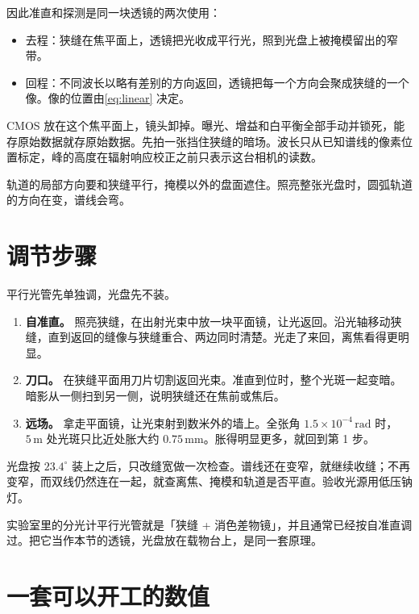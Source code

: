 \documentclass[a4paper,11pt]{ctexart}
\begin{document}
因此准直和探测是同一块透镜的两次使用：
\begin{itemize}
\item 去程：狭缝在焦平面上，透镜把光收成平行光，照到光盘上被掩模留出的窄带。
\item 回程：不同波长以略有差别的方向返回，透镜把每一个方向会聚成狭缝的一个像。像的位置由\eqref{eq:linear} 决定。
\end{itemize}
CMOS 放在这个焦平面上，镜头卸掉。曝光、增益和白平衡全部手动并锁死，能存原始数据就存原始数据。先拍一张挡住狭缝的暗场。波长只从已知谱线的像素位置标定，峰的高度在辐射响应校正之前只表示这台相机的读数。

轨道的局部方向要和狭缝平行，掩模以外的盘面遮住。照亮整张光盘时，圆弧轨道的方向在变，谱线会弯。

\section{调节步骤}
\label{sec:align}

平行光管先单独调，光盘先不装。

\begin{enumerate}
\item \textbf{自准直。} 照亮狭缝，在出射光束中放一块平面镜，让光返回。沿光轴移动狭缝，直到返回的缝像与狭缝重合、两边同时清楚。光走了来回，离焦看得更明显。
\item \textbf{刀口。} 在狭缝平面用刀片切割返回光束。准直到位时，整个光斑一起变暗。暗影从一侧扫到另一侧，说明狭缝还在焦前或焦后。
\item \textbf{远场。} 拿走平面镜，让光束射到数米外的墙上。全张角 \(1.5\times 10^{-4}\,\mathrm{rad}\) 时，\(5\,\mathrm{m}\) 处光斑只比近处胀大约 \(0.75\,\mathrm{mm}\)。胀得明显更多，就回到第 1 步。
\end{enumerate}

光盘按 \(23.4^\circ\) 装上之后，只改缝宽做一次检查。谱线还在变窄，就继续收缝；不再变窄，而双线仍然连在一起，就查离焦、掩模和轨道是否平直。验收光源用低压钠灯。

实验室里的分光计平行光管就是「狭缝 + 消色差物镜」，并且通常已经按自准直调过。把它当作本节的透镜，光盘放在载物台上，是同一套原理。

\section{一套可以开工的数值}
\label{sec:numbers}
\end{document}

